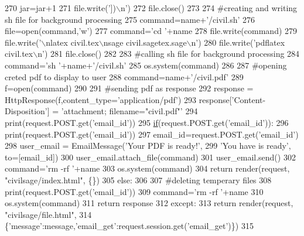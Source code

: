 \begin{DoxyCode}
270             jar=jar+1
271             file.write(\textcolor{stringliteral}{'])\(\backslash\)n'})
272         file.close()
273 
274         \textcolor{comment}{#creating and writing sh file for background processing}
275         command=name+\textcolor{stringliteral}{'/civil.sh'}
276         file=open(command,\textcolor{stringliteral}{'w'})
277         command=\textcolor{stringliteral}{'cd '}+name
278         file.write(command)
279         file.write(\textcolor{stringliteral}{'\(\backslash\)nlatex civil.tex\(\backslash\)nsage civil.sagetex.sage\(\backslash\)n'})
280         file.write(\textcolor{stringliteral}{'pdflatex civil.tex\(\backslash\)n'})
281         file.close()
282 
283         \textcolor{comment}{#calling sh file for background processing}
284         command=\textcolor{stringliteral}{'sh '}+name+\textcolor{stringliteral}{'/civil.sh'}
285         os.system(command)
286 
287         \textcolor{comment}{#opening creted pdf to display to user}
288         command=name+\textcolor{stringliteral}{'/civil.pdf'}
289         f=open(command)
290 
291         \textcolor{comment}{#sending pdf as response}
292         response = HttpResponse(f,content\_type=\textcolor{stringliteral}{'application/pdf'})
293         response[\textcolor{stringliteral}{'Content-Disposition'}] = \textcolor{stringliteral}{'attachment; filename="civil.pdf"'}
294         print(request.POST.get(\textcolor{stringliteral}{'email\_id'}))
295         \hyperlink{bootstrap_8min_8js_ac2d69f5011896c6ed4a54e0dd36f6334}{if}(request.POST.get(\textcolor{stringliteral}{'email\_id'})):
296             print(request.POST.get(\textcolor{stringliteral}{'email\_id'}))
297             email\_id=request.POST.get(\textcolor{stringliteral}{'email\_id'})
298             user\_email = EmailMessage(\textcolor{stringliteral}{'Your PDF is ready!'},
299             \textcolor{stringliteral}{'You have is ready'}, to=[email\_id])
300             user\_email.attach\_file(command)
301             user\_email.send()
302             command=\textcolor{stringliteral}{'rm -rf '}+name
303             os.system(command)
304             \textcolor{keywordflow}{return} render(request, \textcolor{stringliteral}{"civilsage/index.html"}, \{\})
305         \textcolor{keywordflow}{else}:
306 
307             \textcolor{comment}{#deleting temperary files}
308             print(request.POST.get(\textcolor{stringliteral}{'email\_id'}))
309             command=\textcolor{stringliteral}{'rm -rf '}+name
310             os.system(command)
311             \textcolor{keywordflow}{return} response
312     \textcolor{keywordflow}{except}:
313         \textcolor{keywordflow}{return} render(request, \textcolor{stringliteral}{"civilsage/file.html"},
314         \{\textcolor{stringliteral}{'message'}:message,\textcolor{stringliteral}{'email\_get'}:request.session.get(\textcolor{stringliteral}{'email\_get'})\})
315 \end{DoxyCode}


